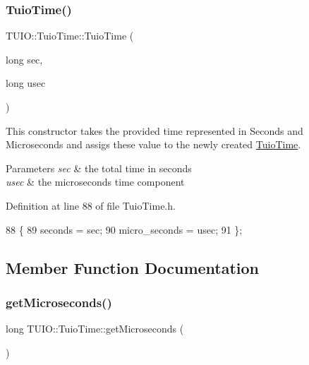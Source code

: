 \subsubsection{\texorpdfstring{Tuio\+Time()}{TuioTime()}\hspace{0.1cm}{\footnotesize\ttfamily [3/3]}}
{\footnotesize\ttfamily T\+U\+I\+O\+::\+Tuio\+Time\+::\+Tuio\+Time (\begin{DoxyParamCaption}\item[{long}]{sec,  }\item[{long}]{usec }\end{DoxyParamCaption})\hspace{0.3cm}{\ttfamily [inline]}}

This constructor takes the provided time represented in Seconds and Microseconds and assigs these value to the newly created \hyperlink{class_t_u_i_o_1_1_tuio_time}{Tuio\+Time}.


\begin{DoxyParams}{Parameters}
{\em sec} & the total time in seconds \\
\hline
{\em usec} & the microseconds time component \\
\hline
\end{DoxyParams}


Definition at line 88 of file Tuio\+Time.\+h.


\begin{DoxyCode}
88                                        \{
89             seconds = sec;
90             micro\_seconds = usec;
91         \};
\end{DoxyCode}


\subsection{Member Function Documentation}
\mbox{\label{class_t_u_i_o_1_1_tuio_time_ac511e63e519d31b7eaab97dee0bea0cc}} 
\subsubsection{\texorpdfstring{get\+Microseconds()}{getMicroseconds()}}
{\footnotesize\ttfamily long T\+U\+I\+O\+::\+Tuio\+Time\+::get\+Microseconds (\begin{DoxyParamCaption}{ }\end{DoxyParamCaption})\hspace{0.3cm}{\ttfamily [inline]}}

